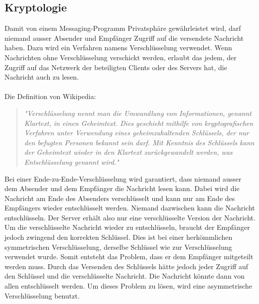 \subsection{Kryptologie}
Damit von einem Messaging-Programm Privatsphäre gewährleistet wird, darf niemand ausser Absender und Empfänger Zugriff auf die versendete Nachricht haben. Dazu wird ein Verfahren namens Verschlüsselung verwendet. Wenn Nachrichten ohne Verschlüsselung verschickt werden, erlaubt das jedem, der Zugriff auf das Netzwerk der beteiligten Clients oder des Servers hat, die Nachricht auch zu lesen.
\\\\
Die Definition von Wikipedia: 
\begin{quote}
	\textit{"Verschlüsselung nennt man die Umwandlung von Informationen, genannt Klartext, in einen Geheimtext.
     Dies geschieht mithilfe von kryptografischen Verfahren unter Verwendung eines geheimzuhaltenden Schlüssels,
     der nur den befugten Personen bekannt sein darf. Mit Kenntnis des Schlüssels kann der Geheimtext wieder in den Klartext zurückgewandelt werden,
     was Entschlüsselung genannt wird."
}
\end{quote}
Bei einer Ende-zu-Ende-Verschlüsselung wird garantiert, dass niemand ausser dem Absender und dem Empfänger die Nachricht lesen kann. Dabei wird die Nachricht am Ende des Absenders verschlüsselt und kann nur am Ende des Empfängers wieder entschlüsselt werden. Niemand dazwischen kann die Nachricht entschlüsseln. Der Server erhält also nur eine verschlüsselte Version der Nachricht. Um die verschlüsselte Nachricht wieder zu entschlüsseln, braucht der Empfänger jedoch zwingend den korrekten Schlüssel. Dies ist bei einer herkömmlichen symmetrischen Verschlüsselung, derselbe Schlüssel wie zur Verschlüsselung verwendet wurde. Somit entsteht das Problem, dass er dem Empfänger mitgeteilt werden muss. Durch das Versenden des Schlüssels hätte jedoch jeder Zugriff auf den Schlüssel und die verschlüsselte Nachricht. Die Nachricht könnte dann von allen entschlüsselt werden. Um dieses Problem zu lösen, wird eine asymmetrische Verschlüsselung benutzt.
